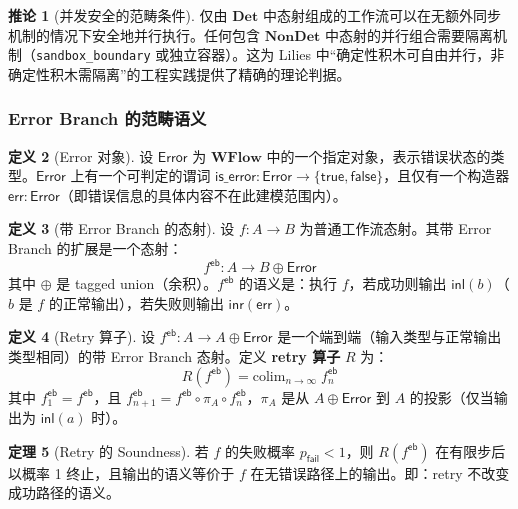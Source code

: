 \documentclass[11pt,a4paper]{article}
\theoremstyle{definition}
\newtheorem{theorem}{定理}[section]
\newtheorem{corollary}[theorem]{推论}
\theoremstyle{definition}
\newtheorem{definition}[theorem]{定义}
\theoremstyle{remark}
\newcommand{\cat}[1]{\mathbf{#1}}
\newcommand{\catWFlow}{\cat{WFlow}}
\newcommand{\catDet}{\cat{Det}}
\newcommand{\catNonDet}{\cat{NonDet}}
\begin{document}
\begin{corollary}[并发安全的范畴条件]
仅由 $\catDet$ 中态射组成的工作流可以在无额外同步机制的情况下安全地并行执行。任何包含 $\catNonDet$ 中态射的并行组合需要隔离机制（\texttt{sandbox\_boundary} 或独立容器）。这为 Lilies 中``确定性积木可自由并行，非确定性积木需隔离''的工程实践提供了精确的理论判据。
\end{corollary}

\subsubsection{Error Branch 的范畴语义}

\begin{definition}[Error 对象]
设 $\mathsf{Error}$ 为 $\catWFlow$ 中的一个指定对象，表示错误状态的类型。$\mathsf{Error}$ 上有一个可判定的谓词 $\mathsf{is\_error}: \mathsf{Error} \to \{\mathsf{true}, \mathsf{false}\}$，且仅有一个构造器 $\mathsf{err}: \mathsf{Error}$（即错误信息的具体内容不在此建模范围内）。
\end{definition}

\begin{definition}[带 Error Branch 的态射]\label{def:error-branch}
设 $f: A \to B$ 为普通工作流态射。其带 Error Branch 的扩展是一个态射：
\[
f^{\mathsf{eb}}: A \to B \oplus \mathsf{Error}
\]
其中 $\oplus$ 是 tagged union（余积）。$f^{\mathsf{eb}}$ 的语义是：执行 $f$，若成功则输出 $\mathsf{inl}(b)$（$b$ 是 $f$ 的正常输出），若失败则输出 $\mathsf{inr}(\mathsf{err})$。
\end{definition}

\begin{definition}[Retry 算子]\label{def:retry}
设 $f^{\mathsf{eb}}: A \to A \oplus \mathsf{Error}$ 是一个端到端（输入类型与正常输出类型相同）的带 Error Branch 态射。定义 \textbf{retry 算子} $R$ 为：
\[
R(f^{\mathsf{eb}}) = \mathrm{colim}_{n \to \infty}\; f^{\mathsf{eb}}_n
\]
其中 $f^{\mathsf{eb}}_1 = f^{\mathsf{eb}}$，且 $f^{\mathsf{eb}}_{n+1} = f^{\mathsf{eb}} \circ \pi_A \circ f^{\mathsf{eb}}_n$，$\pi_A$ 是从 $A \oplus \mathsf{Error}$ 到 $A$ 的投影（仅当输出为 $\mathsf{inl}(a)$ 时）。
\end{definition}

\begin{theorem}[Retry 的 Soundness]\label{thm:retry-soundness}
若 $f$ 的失败概率 $p_{\mathsf{fail}} < 1$，则 $R(f^{\mathsf{eb}})$ 在有限步后以概率 1 终止，且输出的语义等价于 $f$ 在无错误路径上的输出。即：retry 不改变成功路径的语义。
\end{theorem}
\end{document}
